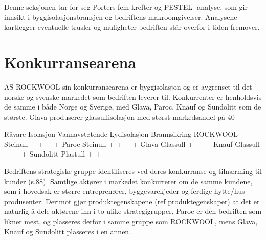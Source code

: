 Denne seksjonen tar for seg Porters fem krefter og PESTEL- analyse, som gir innsikt i byggisolasjonsbransjen og bedriftens makroomgivelser. Analysene kartlegger eventuelle trusler og muligheter bedriften står overfor i tiden fremover.

\section{Konkurransearena}
AS ROCKWOOL sin konkurransearena er byggisolasjon og er avgrenset til det norske og svenske markedet som bedriften leverer til.  Konkurrenter er henholdsvis de samme i både Norge og Sverige, med Glava, Paroc, Knauf og Sundolitt som de største. Glava produserer glassullisolasjon med størst markedsandel på 40%




Råvare
Isolasjon
Vannavstøtende
Lydisolasjon
Brannsikring
ROCKWOOL
Steinull
+
+
+
+
Paroc
Steinull
+
+
+
+
Glava
Glassull
+
-
-
+
Knauf
Glassull
+
-
-
+
Sundolitt
Plastull
+
+
-
-


Bedriftens strategiske gruppe identifiseres ved deres konkurranse og tilnærming til kunder (s.88). Samtlige aktører i markedet konkurrerer om de samme kundene, som i hovedsak er større entreprenører, byggevarekjeder og ferdige hytte/hus-produsenter. Derimot gjør produktegenskapene (ref produktegenskaper) at det er naturlig å dele aktørene inn i to ulike strategigrupper. Paroc er den bedriften som likner mest, og plasseres derfor i samme gruppe som ROCKWOOL, mens Glava, Knauf og Sundolitt plasseres i en annen. 
 
